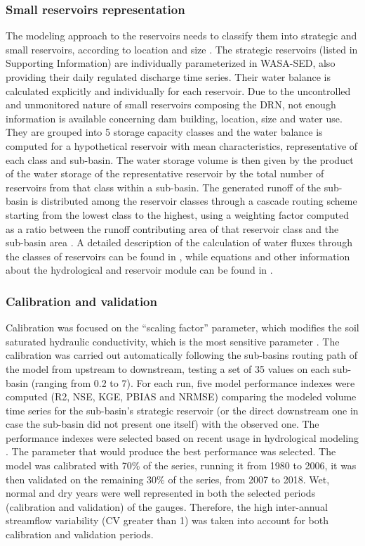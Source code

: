 \documentclass[draft]{agujournal2019}
\begin{document}
\subsubsection{Small reservoirs representation}
The modeling approach to the reservoirs needs to classify them into strategic and small reservoirs, according to location and size \cite{Guntner2004}. The strategic reservoirs (listed in Supporting Information) are individually parameterized in WASA-SED, also providing their daily regulated discharge time series. Their water balance is calculated explicitly and individually for each reservoir. Due to the uncontrolled and unmonitored nature of small reservoirs composing the DRN, not enough information is available concerning dam building, location, size and water use. They are grouped into 5 storage capacity classes and the water balance is computed for a hypothetical reservoir with mean characteristics, representative of each class and sub-basin. The water storage volume is then given by the product of the water storage of the representative reservoir by the total number of reservoirs from that class within a sub-basin. The generated runoff of the sub-basin is distributed among the reservoir classes through a cascade routing scheme starting from the lowest class to the highest, using a weighting factor computed as a ratio between the runoff contributing area of that reservoir class and the sub-basin area \cite{Mamede2018}. A detailed description of the calculation of water fluxes through the classes of reservoirs can be found in , while equations and other information about the hydrological and reservoir module can be found in .

\subsubsection{Calibration and validation}
Calibration was focused on the “scaling factor” parameter, which modifies the soil saturated hydraulic conductivity, which is the most sensitive parameter \cite{Guntner2002,WASA-SEDManual2021}. The calibration was carried out automatically following the sub-basins routing path of the model from upstream to downstream, testing a set of 35 values on each sub-basin (ranging from 0.2 to 7). For each run, five model performance indexes were computed (R2, NSE, KGE, PBIAS and NRMSE) comparing the modeled volume time series for the sub-basin’s strategic reservoir (or the direct downstream one in case the sub-basin did not present one itself) with the observed one. The performance indexes were selected based on recent usage in hydrological modeling \cite{Marahatta2021,Knoben2019,Uniyal2019}. The parameter that would produce the best performance was selected. The model was calibrated with 70\% of the series, running it from 1980 to 2006, it was then validated on the remaining 30\% of the series, from 2007 to 2018. Wet, normal and dry years were well represented in both the selected periods (calibration and validation) of the gauges. Therefore, the high inter-annual streamflow variability (CV greater than 1) was taken into account for both calibration and validation periods.
\end{document}

